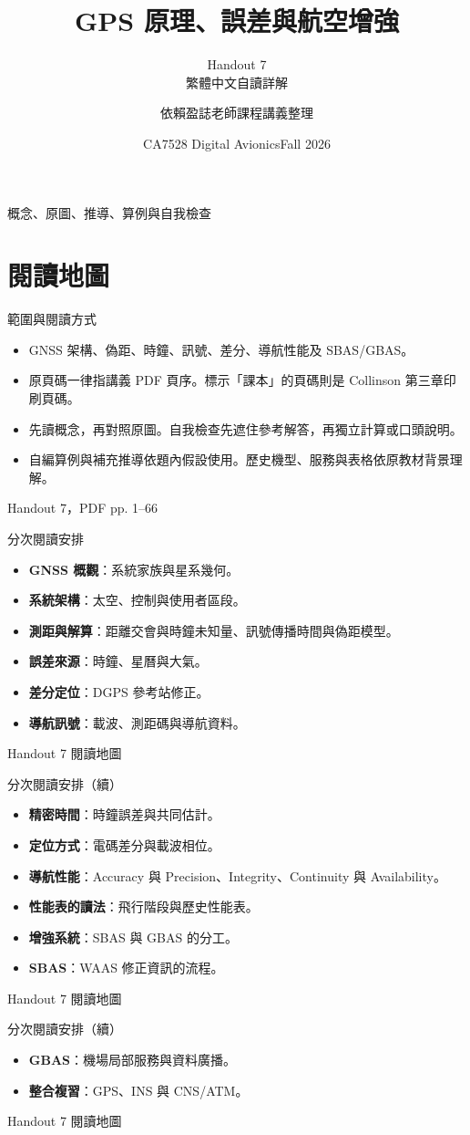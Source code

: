 \documentclass[aspectratio=169,11pt]{beamer}
\title{GPS 原理、誤差與航空增強}
\subtitle{Handout 7\\繁體中文自讀詳解}
\author{依賴盈誌老師課程講義整理}
\date{CA7528 Digital Avionics\quad Fall 2026}
\newcommand{\src}[1]{\par\vfill{\scriptsize\color{teal}#1}}
\newcommand{\slide}[3]{\begin{frame}[t]{#1}#3\src{#2}\end{frame}}
\newcommand{\bi}{\begin{itemize}\setlength{\itemsep}{5pt}}
\newcommand{\ei}{\end{itemize}}
\begin{document}
\begin{frame}\titlepage\centering\small 概念、原圖、推導、算例與自我檢查\end{frame}
\section{閱讀地圖}
\slide{範圍與閱讀方式}{Handout 7，PDF pp. 1--66}{
\bi
\item GNSS 架構、偽距、時鐘、訊號、差分、導航性能及 SBAS/GBAS。
\item 原頁碼一律指講義 PDF 頁序。標示「課本」的頁碼則是 Collinson 第三章印刷頁碼。
\item 先讀概念，再對照原圖。自我檢查先遮住參考解答，再獨立計算或口頭說明。
\item 自編算例與補充推導依題內假設使用。歷史機型、服務與表格依原教材背景理解。
\ei
}
\slide{分次閱讀安排}{Handout 7 閱讀地圖}{
\small
\bi
\item \textbf{GNSS 概觀}：系統家族與星系幾何。
\item \textbf{系統架構}：太空、控制與使用者區段。
\item \textbf{測距與解算}：距離交會與時鐘未知量、訊號傳播時間與偽距模型。
\item \textbf{誤差來源}：時鐘、星曆與大氣。
\item \textbf{差分定位}：DGPS 參考站修正。
\item \textbf{導航訊號}：載波、測距碼與導航資料。
\ei
}
\slide{分次閱讀安排（續）}{Handout 7 閱讀地圖}{
\small
\bi
\item \textbf{精密時間}：時鐘誤差與共同估計。
\item \textbf{定位方式}：電碼差分與載波相位。
\item \textbf{導航性能}：Accuracy 與 Precision、Integrity、Continuity 與 Availability。
\item \textbf{性能表的讀法}：飛行階段與歷史性能表。
\item \textbf{增強系統}：SBAS 與 GBAS 的分工。
\item \textbf{SBAS}：WAAS 修正資訊的流程。
\ei
}
\slide{分次閱讀安排（續）}{Handout 7 閱讀地圖}{
\small
\bi
\item \textbf{GBAS}：機場局部服務與資料廣播。
\item \textbf{整合複習}：GPS、INS 與 CNS/ATM。
\ei
}
\end{document}

